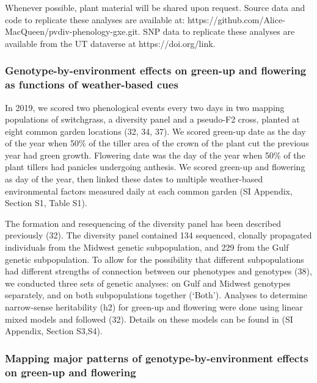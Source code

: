\documentclass[
  9pt,
  twocolumn,
  twoside]{pnas-new}
\begin{document}
Whenever possible, plant material will be shared upon request. Source
data and code to replicate these analyses are available at:
https://github.com/Alice-MacQueen/pvdiv-phenology-gxe.git. SNP data to
replicate these analyses are available from the UT dataverse at
https://doi.org/link.

\subsubsection{Genotype-by-environment effects on green-up and flowering
as functions of weather-based
cues}\label{genotype-by-environment-effects-on-green-up-and-flowering-as-functions-of-weather-based-cues}

In 2019, we scored two phenological events every two days in two mapping
populations of switchgrass, a diversity panel and a pseudo-F2 cross,
planted at eight common garden locations (32, 34, 37). We scored
green-up date as the day of the year when 50\% of the tiller area of the
crown of the plant cut the previous year had green growth. Flowering
date was the day of the year when 50\% of the plant tillers had panicles
undergoing anthesis. We scored green-up and flowering as day of the
year, then linked these dates to multiple weather-based environmental
factors measured daily at each common garden (SI Appendix, Section S1,
Table S1).

The formation and resequencing of the diversity panel has been described
previously (32). The diversity panel contained 134 sequenced, clonally
propagated individuals from the Midwest genetic subpopulation, and 229
from the Gulf genetic subpopulation. To allow for the possibility that
different subpopulations had different strengths of connection between
our phenotypes and genotypes (38), we conducted three sets of genetic
analyses: on Gulf and Midwest genotypes separately, and on both
subpopulations together (`Both'). Analyses to determine narrow-sense
heritability (h2) for green-up and flowering were done using linear
mixed models and followed (32). Details on these models can be found in
(SI Appendix, Section S3,S4).

\subsubsection{Mapping major patterns of genotype-by-environment effects
on green-up and
flowering}\label{mapping-major-patterns-of-genotype-by-environment-effects-on-green-up-and-flowering-1}
\end{document}
